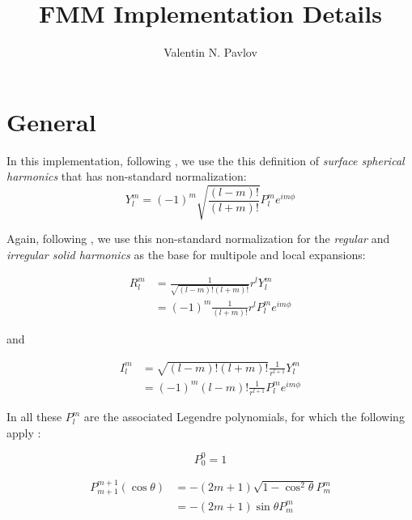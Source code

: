 \documentclass{article}
\begin{document}
\title{FMM Implementation Details}
\author{Valentin N. Pavlov}
\maketitle
\section{General}

In this implementation, following \cite{dehnen}, we use the this definition of {\em surface spherical harmonics} that has non-standard normalization:
\begin{equation}
  Y^m_l = (-1)^m \sqrt{\frac{(l-m)!}{(l+m)!}} P^m_l e^{i m \phi}
\end{equation}

Again, following \cite{dehnen}, we use this non-standard normalization for the {\em regular} and {\em irregular solid harmonics} as the base for multipole and local expansions:

\begin{equation} \label{eq:2}
  \begin{split}
    R^m_l & = \frac{1}{\sqrt{(l-m)! (l+m)!}} r^l Y^m_l \\
    & = (-1)^m \frac{1}{(l+m)!} r^l P^m_l e^{i m \phi}
  \end{split}
\end{equation}

and

\begin{equation} \label{eq:3}
  \begin{split}
    I^m_l & = \sqrt{(l-m)! (l+m)!} \frac{1}{r^{l+1}} Y^m_l \\
    & = (-1)^m {(l-m)!} \frac{1}{r^{l+1}} P^m_l e^{i m \phi}
  \end{split}
\end{equation}

In all these $P^m_l$ are the associated Legendre polynomials, for which the following apply \cite{alp}:

\begin{equation} \label{eq:4}
  P^0_0 = 1
\end{equation}

\begin{equation} \label{eq:5}
  \begin{split}
    P^{m+1}_{m+1}(\cos{\theta}) & = -(2m+1) \sqrt{1-\cos^2{\theta}} P^m_m \\
    & = -(2m+1) \sin{\theta} P^m_m
  \end{split}
\end{equation}
\end{document}
